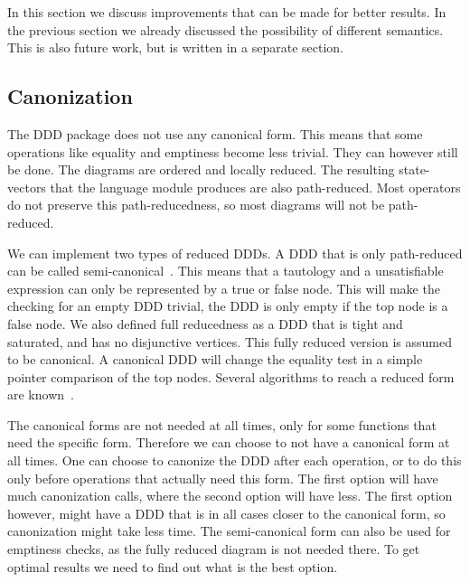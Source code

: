 In this section we discuss improvements that can be made for better results. In the previous section we already discussed the possibility of different semantics. This is also future work, but is written in a separate section.

\subsection{Canonization}
The DDD package does not use any canonical form. This means that some operations like equality and emptiness become less trivial. They can however still be done. The diagrams are ordered and locally reduced. The resulting state-vectors that the language module produces are also path-reduced. Most operators do not preserve this path-reducedness, so most diagrams will not be path-reduced. 

We can implement two types of reduced DDDs. A DDD that is only path-reduced can be called semi-canonical~\cite{ddds}. This means that a tautology and a unsatisfiable expression can only be represented by a true or false node. This will make the checking for an empty DDD trivial, the DDD is only empty if the top node is a false node. We also defined full reducedness as a DDD that is tight and saturated, and has no disjunctive vertices. This fully reduced version is assumed to be canonical. A canonical DDD will change the equality test in a simple pointer comparison of the top nodes.
Several algorithms to reach a reduced form are known~\cite{ddd-mt-98}.

The canonical forms are not needed at all times, only for some functions that need the specific form. Therefore we can choose to not have a canonical form at all times. One can choose to canonize the DDD after each operation, or to do this only before operations that actually need this form. The first option will have much canonization calls, where the second option will have less. The first option however, might have a DDD that is in all cases closer to the canonical form, so canonization might take less time. The semi-canonical form can also be used for emptiness checks, as the fully reduced diagram is not needed there. To get optimal results we need to find out what is the best option.

